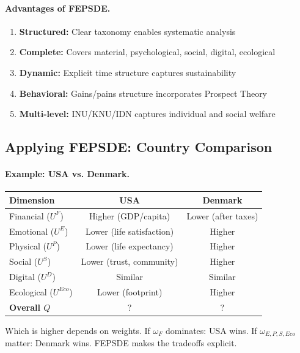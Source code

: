 \documentclass[12pt,a4paper]{article}
\begin{document}
\paragraph{Advantages of FEPSDE.}
\begin{enumerate}
  \item \textbf{Structured:} Clear taxonomy enables systematic analysis
  \item \textbf{Complete:} Covers material, psychological, social, digital, ecological
  \item \textbf{Dynamic:} Explicit time structure captures sustainability
  \item \textbf{Behavioral:} Gains/pains structure incorporates Prospect Theory
  \item \textbf{Multi-level:} INU/KNU/IDN captures individual and social welfare
\end{enumerate}

\subsection{Applying FEPSDE: Country Comparison}

\paragraph{Example: USA vs. Denmark.}
\begin{center}
\renewcommand{\arraystretch}{1.2}
\begin{tabular}{lcc}
\hline
\textbf{Dimension} & \textbf{USA} & \textbf{Denmark} \\
\hline
Financial ($U^F$) & Higher (GDP/capita) & Lower (after taxes) \\
Emotional ($U^E$) & Lower (life satisfaction) & Higher \\
Physical ($U^P$) & Lower (life expectancy) & Higher \\
Social ($U^S$) & Lower (trust, community) & Higher \\
Digital ($U^D$) & Similar & Similar \\
Ecological ($U^{Eco}$) & Lower (footprint) & Higher \\
\hline
\textbf{Overall $Q$} & ? & ? \\
\hline
\end{tabular}
\end{center}

Which is higher depends on weights.
If $\omega_F$ dominates: USA wins.
If $\omega_{E,P,S,Eco}$ matter: Denmark wins.
FEPSDE makes the tradeoffs explicit.
\end{document}
